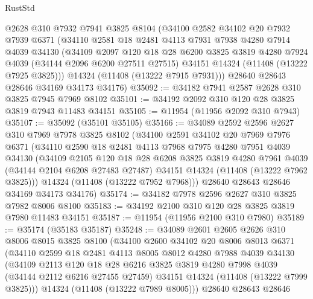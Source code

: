 \begin{lexlean}{RustStd}
\begin{coremodule}
    @2628
    @310
    @7932
    @7941
    @3825
    @8104
    (@34100
      @2582
      @34102
      @20
      @7932
      @7939
      @6371
      (@34110
        @2581
        @18
        @2481
        @4113
        @7931
        @7938
        @4280
        @7914
        @4039
        @34130
        (@34109
          @2097
          @120
          @18
          @28
          @6200
          @3825
          @3819
          @4280
          @7924
          @4039
          (@34144 @2096 @6200 @27511 @27515)
          @34151
          @14324
          (@11408 (@13222 @7925 @3825)))
        @14324
        (@11408 (@13222 @7915 @7931)))
      @28640
      @28643
      @28646
      @34169
      @34173
      @34176)
@35092 := @34182 @7941 @2587 @2628 @310 @3825 @7945 @7969 @8102
@35101 := @34192 @2092 @310 @120 @28 @3825 @3819 @7943 @11483 @34151
@35105 := @11954 (@11956 @2092 @310 @7943)
@35107 := @35092 (@35101 @35105)
@35166 := @34089
    @2592
    @2596
    @2627
    @310
    @7969
    @7978
    @3825
    @8102
    (@34100
      @2591
      @34102
      @20
      @7969
      @7976
      @6371
      (@34110
        @2590
        @18
        @2481
        @4113
        @7968
        @7975
        @4280
        @7951
        @4039
        @34130
        (@34109
          @2105
          @120
          @18
          @28
          @6208
          @3825
          @3819
          @4280
          @7961
          @4039
          (@34144 @2104 @6208 @27483 @27487)
          @34151
          @14324
          (@11408 (@13222 @7962 @3825)))
        @14324
        (@11408 (@13222 @7952 @7968)))
      @28640
      @28643
      @28646
      @34169
      @34173
      @34176)
@35174 := @34182 @7978 @2596 @2627 @310 @3825 @7982 @8006 @8100
@35183 := @34192 @2100 @310 @120 @28 @3825 @3819 @7980 @11483 @34151
@35187 := @11954 (@11956 @2100 @310 @7980)
@35189 := @35174 (@35183 @35187)
@35248 := @34089
    @2601
    @2605
    @2626
    @310
    @8006
    @8015
    @3825
    @8100
    (@34100
      @2600
      @34102
      @20
      @8006
      @8013
      @6371
      (@34110
        @2599
        @18
        @2481
        @4113
        @8005
        @8012
        @4280
        @7988
        @4039
        @34130
        (@34109
          @2113
          @120
          @18
          @28
          @6216
          @3825
          @3819
          @4280
          @7998
          @4039
          (@34144 @2112 @6216 @27455 @27459)
          @34151
          @14324
          (@11408 (@13222 @7999 @3825)))
        @14324
        (@11408 (@13222 @7989 @8005)))
      @28640
      @28643
      @28646

\end{coremodule}
\end{lexlean}
